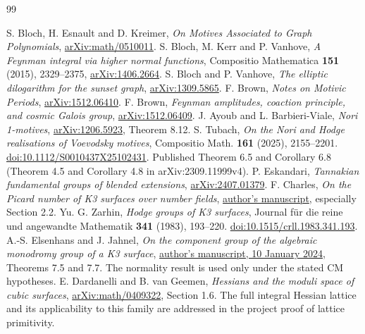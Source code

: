 \documentclass[11pt,a4paper,oneside]{article}
\theoremstyle{plain}
\theoremstyle{definition}
\theoremstyle{remark}
\numberwithin{equation}{section}
\begin{document}
\begin{thebibliography}{99}
 S. Bloch, H. Esnault and D. Kreimer, \emph{On Motives Associated to Graph Polynomials}, \href{https://arxiv.org/abs/math/0510011}{arXiv:math/0510011}.
 S. Bloch, M. Kerr and P. Vanhove, \emph{A Feynman integral via higher normal functions}, Compositio Mathematica \textbf{151} (2015), 2329--2375, \href{https://arxiv.org/abs/1406.2664}{arXiv:1406.2664}.
 S. Bloch and P. Vanhove, \emph{The elliptic dilogarithm for the sunset graph}, \href{https://arxiv.org/abs/1309.5865}{arXiv:1309.5865}.
 F. Brown, \emph{Notes on Motivic Periods}, \href{https://arxiv.org/abs/1512.06410}{arXiv:1512.06410}.
 F. Brown, \emph{Feynman amplitudes, coaction principle, and cosmic Galois group}, \href{https://arxiv.org/abs/1512.06409}{arXiv:1512.06409}.
 J. Ayoub and L. Barbieri-Viale, \emph{Nori 1-motives}, \href{https://arxiv.org/abs/1206.5923}{arXiv:1206.5923}, Theorem 8.12.
 S. Tubach, \emph{On the Nori and Hodge realisations of Voevodsky motives},
Compositio Math. \textbf{161} (2025), 2155--2201.
\href{https://doi.org/10.1112/S0010437X25102431}{doi:10.1112/S0010437X25102431}.
Published Theorem 6.5 and Corollary 6.8 (Theorem 4.5 and Corollary 4.8 in arXiv:2309.11999v4).
 P. Eskandari, \emph{Tannakian fundamental groups of blended extensions}, \href{https://arxiv.org/abs/2407.01379}{arXiv:2407.01379}.
 F. Charles, \emph{On the Picard number of K3 surfaces over number fields}, \href{https://www.imo.universite-paris-saclay.fr/~francois.charles/Picard.pdf}{author's manuscript}, especially Section 2.2.
 Yu. G. Zarhin, \emph{Hodge groups of K3 surfaces}, Journal für die reine und angewandte Mathematik \textbf{341} (1983), 193--220. \href{https://doi.org/10.1515/crll.1983.341.193}{doi:10.1515/crll.1983.341.193}.
 A.-S. Elsenhans and J. Jahnel, \emph{On the component group of the algebraic monodromy group of a K3 surface}, \href{https://wwwuser.gwdguser.de/~jjahnel/Arbeiten/Komponentengruppe_v4f.pdf}{author's manuscript, 10 January 2024}, Theorems 7.5 and 7.7. The normality result is used only under the stated CM hypotheses.
 E. Dardanelli and B. van Geemen, \emph{Hessians and the moduli space of cubic surfaces}, \href{https://arxiv.org/abs/math/0409322}{arXiv:math/0409322}, Section 1.6. The full integral Hessian lattice and its applicability to this family are addressed in the project proof of lattice primitivity.

\end{thebibliography}
\end{document}
